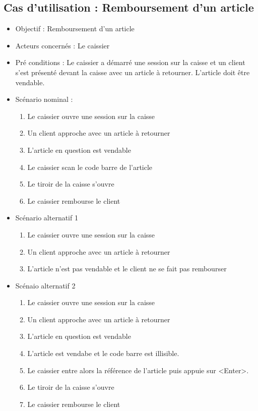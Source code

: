 \subsection{Cas d'utilisation : Remboursement d'un article}
\begin{itemize}
	\item Objectif : Remboursement d'un article
	\item Acteurs concernés : Le caissier
	\item Pré conditions : Le caissier a démarré une session sur la caisse et un client s'est présenté devant la caisse avec un article à retourner. L'article doit être vendable.
	\item Scénario nominal :
	\begin{enumerate}
		\item Le caissier ouvre une session sur la caisse
		\item Un client approche avec un article à retourner
		\item L'article en question est vendable
		\item Le caissier scan le code barre de l'article
		\item Le tiroir de la caisse s'ouvre
		\item Le caissier rembourse le client
	\end{enumerate}
	
	\item Scénario alternatif 1
	\begin{enumerate}
		\item Le caissier ouvre une session sur la caisse
		\item Un client approche avec un article à retourner
		\item L'article n'est pas vendable et le client ne se fait pas rembourser
	\end{enumerate}
	
	\item Scénaio alternatif 2
	\begin{enumerate}
		\item Le caissier ouvre une session sur la caisse
		\item Un client approche avec un article à retourner
		\item L'article en question est vendable
		\item L'article est vendabe et le code barre est illisible.
		\item Le caissier entre alors la référence de l'article puis appuie sur <Enter>. 
		\item Le tiroir de la caisse s'ouvre
		\item Le caissier rembourse le client
	\end{enumerate}
\end{itemize}

